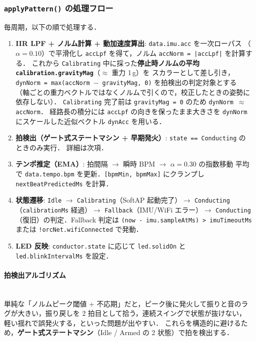 \documentclass[lualatex,book,paper=a4paper,jafontsize=11.5pt,jafontscale=1.05]{jlreq}
\begin{document}
\subsubsection{\texttt{applyPattern()} の処理フロー}

毎周期，以下の順で処理する．

\begin{enumerate}
  \item \textbf{IIR LPF + ノルム計算 + 動加速度算出}: \texttt{data.imu.acc} を一次ローパス
        （$\alpha = 0.10$）で平滑化し \texttt{accLpf} を得て，ノルム \texttt{accNorm = |accLpf|} を計算する．
        これから \texttt{Calibrating} 中に採った\textbf{停止時ノルムの平均 \texttt{calibration.gravityMag}}（$\approx$ 重力 1\,g）を
        スカラーとして差し引き，\texttt{dynNorm = max(accNorm $-$ gravityMag,\,0)} を拍検出の判定対象とする
        （軸ごとの重力ベクトルではなくノルムで引くので，校正したときの姿勢に依存しない）．
        \texttt{Calibrating} 完了前は \texttt{gravityMag = 0} のため \texttt{dynNorm $\approx$ accNorm}．
        経路長の積分には \texttt{accLpf} の向きを保ったまま大きさを \texttt{dynNorm} にスケールした近似ベクトル \texttt{dynAcc} を用いる．
  \item \textbf{拍検出（ゲート式ステートマシン + 早期発火）}: \texttt{state == Conducting} のときのみ実行．
        詳細は次項．
  \item \textbf{テンポ推定（EMA）}: 拍間隔 $\to$ 瞬時 BPM $\to$ $\alpha = 0.30$ の指数移動
        平均で \texttt{data.tempo.bpm} を更新．\texttt{[bpmMin, bpmMax]} にクランプし
        \texttt{nextBeatPredictedMs} を計算．
  \item \textbf{状態遷移}: \texttt{Idle} $\to$ \texttt{Calibrating}（SoftAP 起動完了）$\to$
        \texttt{Conducting}（\texttt{calibrationMs} 経過）$\to$ \texttt{Fallback}（IMU/WiFi エラー）$\to$
        \texttt{Conducting}（復旧）の判定．Fallback 判定は \texttt{(now - imu.sampleAtMs) > imuTimeoutMs}
        または \texttt{!orcNet.wifiConnected} で発動．
  \item \textbf{LED 反映}: \texttt{conductor.state} に応じて \texttt{led.solidOn} と \texttt{led.blinkIntervalMs} を設定．
\end{enumerate}

\paragraph{拍検出アルゴリズム}\mbox{}\\
単純な「ノルムピーク閾値 + 不応期」だと，ピーク後に発火して振りと音のラグが大きい，振り戻しを
2 拍目として拾う，連続スイングで状態が抜けない，軽い揺れで誤発火する，といった問題が出やすい．
これらを構造的に避けるため，\textbf{ゲート式ステートマシン}（Idle / Armed の 2 状態）で拍を検出する．
\end{document}
